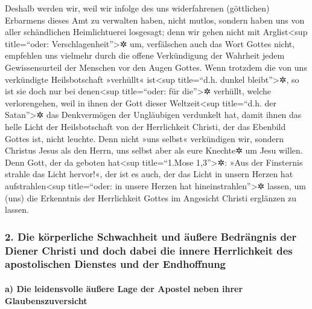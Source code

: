  Deshalb werden wir, weil wir infolge des uns
widerfahrenen (göttlichen) Erbarmens dieses Amt zu verwalten haben,
nicht mutlos,  sondern haben uns von aller schändlichen
Heimlichtuerei losgesagt; denn wir gehen nicht mit Arglist\textless sup
title=``oder: Verschlagenheit''\textgreater✲ um, verfälschen auch das
Wort Gottes nicht, empfehlen uns vielmehr durch die offene Verkündigung
der Wahrheit jedem Gewissensurteil der Menschen vor den Augen Gottes.
 Wenn trotzdem die von uns verkündigte Heilsbotschaft
»verhüllt« ist\textless sup title=``d.h. dunkel bleibt''\textgreater✲,
so ist sie doch nur bei denen\textless sup title=``oder: für
die''\textgreater✲ verhüllt, welche verlorengehen,  weil
in ihnen der Gott dieser Weltzeit\textless sup title=``d.h. der
Satan''\textgreater✲ das Denkvermögen der Ungläubigen verdunkelt hat,
damit ihnen das helle Licht der Heilsbotschaft von der Herrlichkeit
Christi, der das Ebenbild Gottes ist, nicht leuchte.  Denn
nicht »uns selbst« verkündigen wir, sondern Christus Jesus als den
Herrn, uns selbst aber als eure Knechte✲ um Jesu willen. 
Denn Gott, der da geboten hat\textless sup title=``1.Mose
1,3''\textgreater✲: »Aus der Finsternis strahle das Licht hervor!«, der
ist es auch, der das Licht in unsern Herzen hat aufstrahlen\textless sup
title=``oder: in unsere Herzen hat hineinstrahlen''\textgreater✲ lassen,
um (uns) die Erkenntnis der Herrlichkeit Gottes im Angesicht Christi
erglänzen zu lassen.

\hypertarget{die-kuxf6rperliche-schwachheit-und-uxe4uuxdfere-bedruxe4ngnis-der-diener-christi-und-doch-dabei-die-innere-herrlichkeit-des-apostolischen-dienstes-und-der-endhoffnung}{%
\subsubsection{2. Die körperliche Schwachheit und äußere Bedrängnis der
Diener Christi und doch dabei die innere Herrlichkeit des apostolischen
Dienstes und der
Endhoffnung}\label{die-kuxf6rperliche-schwachheit-und-uxe4uuxdfere-bedruxe4ngnis-der-diener-christi-und-doch-dabei-die-innere-herrlichkeit-des-apostolischen-dienstes-und-der-endhoffnung}}

\hypertarget{a-die-leidensvolle-uxe4uuxdfere-lage-der-apostel-neben-ihrer-glaubenszuversicht}{%
\paragraph{a) Die leidensvolle äußere Lage der Apostel neben ihrer
Glaubenszuversicht}\label{a-die-leidensvolle-uxe4uuxdfere-lage-der-apostel-neben-ihrer-glaubenszuversicht}}

